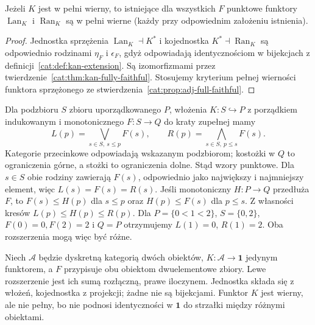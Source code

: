 \begin{wniosek}\label{cat:cor:kan-fully-faithful}
Jeżeli $K$ jest w pełni wierny, to istniejące dla wszystkich $F$ punktowe funktory $\operatorname{Lan}_K$ i $\operatorname{Ran}_K$ są w pełni wierne (każdy przy odpowiednim założeniu istnienia).
\end{wniosek}
\begin{proof}
Jednostka sprzężenia $\operatorname{Lan}_K\dashv K^*$ i kojednostka $K^*\dashv\operatorname{Ran}_K$ są odpowiednio rodzinami $\eta_F$ i $\epsilon_F$, gdyż odpowiadają identycznościom w bijekcjach z definicji~\ref{cat:def:kan-extension}. Są izomorfizmami przez twierdzenie~\ref{cat:thm:kan-fully-faithful}. Stosujemy kryterium pełnej wierności funktora sprzężonego ze stwierdzenia~\ref{cat:prop:adj-full-faithful}.
\end{proof}
\begin{przyklad}[Porządki]\label{cat:ex:kan-poset}
Dla podzbioru $S$ zbioru uporządkowanego $P$, włożenia $K:S\hookrightarrow P$ z porządkiem indukowanym i monotonicznego $F:S\to Q$ do kraty zupełnej mamy
\[
 L(p)=\bigvee_{s\in S,\ s\le p}F(s),\qquad
 R(p)=\bigwedge_{s\in S,\ p\le s}F(s).
\]
Kategorie przecinkowe odpowiadają wskazanym podzbiorom; kostożki w $Q$ to ograniczenia górne, a stożki to ograniczenia dolne. Stąd wzory punktowe. Dla $s\in S$ obie rodziny zawierają $F(s)$, odpowiednio jako największy i najmniejszy element, więc $L(s)=F(s)=R(s)$. Jeśli monotoniczny $H:P\to Q$ przedłuża $F$, to $F(s)\le H(p)$ dla $s\le p$ oraz $H(p)\le F(s)$ dla $p\le s$. Z własności kresów $L(p)\le H(p)\le R(p)$. Dla $P=\{0<1<2\}$, $S=\{0,2\}$, $F(0)=0,F(2)=2$ i $Q=P$ otrzymujemy $L(1)=0$, $R(1)=2$. Oba rozszerzenia mogą więc być różne.
\end{przyklad}
\begin{przyklad}\label{cat:ex:kan-not-fully-faithful}
Niech $\mathcal A$ będzie dyskretną kategorią dwóch obiektów, $K:\mathcal A\to\mathbf1$ jedynym funktorem, a $F$ przypisuje obu obiektom dwuelementowe zbiory. Lewe rozszerzenie jest ich sumą rozłączną, prawe iloczynem. Jednostka składa się z włożeń, kojednostka z projekcji; żadne nie są bijekcjami. Funktor $K$ jest wierny, ale nie pełny, bo nie podnosi identyczności w $\mathbf1$ do strzałki między różnymi obiektami.
\end{przyklad}

